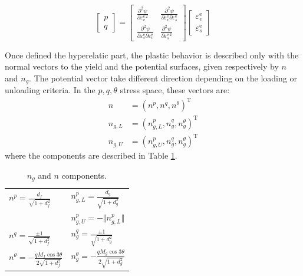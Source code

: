 \documentclass[preprint,12pt,a4paper]{elsarticle}
\begin{document}
\begin{equation}\label{PZ1}
\left[ 
\begin{array}{c}
p \\ 
q
\end{array}
\right]=
\left[\begin{array}{cc}
\frac{\partial^{2} \psi}{\partial \varepsilon_{v}^{\mathrm{e}\,2}}
 &  
 \frac{\partial^{2} \psi}{\partial\varepsilon_{v}^\mathrm{e} \partial\varepsilon_{s}^\mathrm{e}} 
 \\
 \frac{\partial^{2} \psi}{\partial\varepsilon_{s}^\mathrm{e} \partial\varepsilon_{v}^\mathrm{e}} 
 & 
\frac{\partial^{2} \psi}{\partial\varepsilon_{s}^\mathrm{e\,2}}
\end{array}
\right]
\left[
\begin{array}{c}
\varepsilon_{v}^{\mathrm{e}}
 \\ 
\varepsilon_{s}^{\mathrm{e}}
\end{array}
\right]
\end{equation}

Once defined the hyperelatic part, the plastic behavior is described only with the normal vectors to the yield and the potential surfaces, given  respectively by $n$ and $n_{g}$. The potential vector take different direction depending on the loading or unloading criteria. In the $p, q, \theta $
stress space, these vectors are:
\begin{eqnarray}
n &=\left(n^{p}, n^{q}, n^{\theta}\right)^{\mathrm{T}} \\ n_{g,L} &=\left(n_{g,L}^{p}, n_{g}^{q}, n_{g}^{\theta}\right)^{\mathrm{T}}
\\ n_{g,U} &=\left(n_{g,U}^{p}, n_{g}^{q}, n_{g}^{\theta}\right)^{\mathrm{T}}
\end{eqnarray}
where the components are described in Table \ref{tab2}.

\begin{table}[H]
\caption{\label{tab2} $n_{g}$ and $n$ components.} 
\centering
	\begin{tabular}{l|l}
        $n^{p} =\frac{d_{f}}{\sqrt{1+d_{f}^{2}}}$ &
        $n_{g,L}^{p} =\frac{d_{g}}{\sqrt{1+d_{g}^{2}}}$
        \\ 
         &
        $n_{g,U}^{p} = -\Vert n_{g,L}^{p} \Vert$ \\
        $n^{q} =\frac{\pm 1}{\sqrt{1+d_{f}^{2}}}$ &
        $n_{g}^{q} = \frac{\pm 1}{\sqrt{1+d_{g}^{2}}}$ \\  
        $n^{\theta} =-\frac{q M_{f} \cos 3 \theta}{2 \sqrt{1+d_{f}^{2}}}$ &
         $n_{g}^{\theta} =-\frac{q M_{g} \cos 3 \theta}{2 \sqrt{1+d_{g}^{2}}}$
	\end{tabular}
\end{table}
\end{document}
